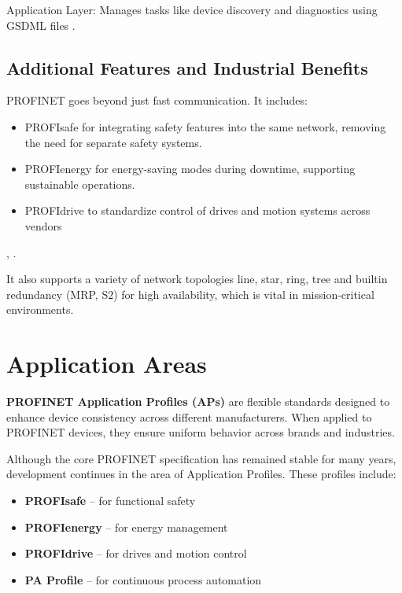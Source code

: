 \documentclass[conference]{IEEEtran}
\begin{document}
Application Layer: Manages tasks like device discovery and diagnostics using GSDML files \cite{patzke1998fieldbus}.

\subsection{Additional Features and Industrial Benefits}
PROFINET goes beyond just fast communication. It includes:

\begin{itemize}
    \item PROFIsafe for integrating safety features into the same network, removing the need for separate safety systems.
    \item PROFIenergy for energy-saving modes during downtime, supporting sustainable operations.
    \item PROFIdrive to standardize control of drives and motion systems across vendors 
\end{itemize}




\cite{galloway2012industrial}, \cite{jasperneite2007limits}.

It also supports a variety of network topologies line, star, ring, tree and builtin redundancy (MRP, S2) for high availability, which is vital in mission-critical environments.

\section{Application Areas}
\textbf{PROFINET Application Profiles (APs)} are flexible standards designed to enhance device consistency across different manufacturers. When applied to PROFINET devices, they ensure uniform behavior across brands and industries.

Although the core PROFINET specification has remained stable for many years, development continues in the area of Application Profiles. These profiles include:

\begin{itemize}
    \item \textbf{PROFIsafe} – for functional safety
    \item \textbf{PROFIenergy} – for energy management
    \item \textbf{PROFIdrive} – for drives and motion control
    \item \textbf{PA Profile} – for continuous process automation
\end{itemize}
\end{document}
